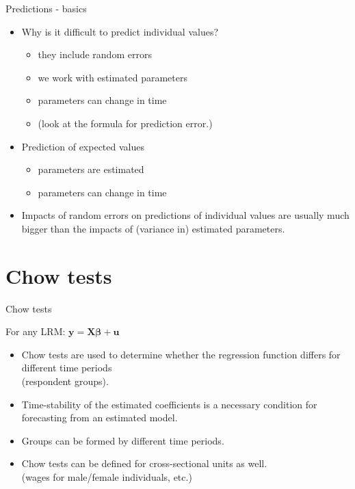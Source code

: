 \documentclass{beamer}
\begin{document}
\begin{frame}{Predictions - basics}
\begin{itemize}
\item Why is it difficult to predict individual values? 
\begin{itemize}
\item they include random errors
\item we work with estimated parameters
\item parameters can change in time
\item (look at the formula for prediction error.)
\end{itemize}
\vspace{0.3cm}
\item Prediction of expected values
\begin{itemize}
\item parameters are estimated
\item parameters can change in time
\end{itemize}
\vspace{0.3cm}
\item Impacts of random errors on predictions of individual values are usually much bigger than the impacts of (variance in) estimated parameters.
\end{itemize}
\end{frame}

\section{Chow tests}
\begin{frame}{Chow tests}

For any LRM: $\bm{y} = \bm{X\beta}+\bm{u}$
\vspace{0.3cm}
\begin{itemize}
\item Chow tests are used to determine whether the regression function differs for different time periods \\(respondent groups). 
\item Time-stability of the estimated coefficients is a necessary condition for forecasting from an estimated model.
\item Groups can be formed by different time periods.

\item Chow tests can be defined for cross-sectional units as well. \\(wages for male/female individuals, etc.)
\end{itemize}

\end{frame}
\end{document}

